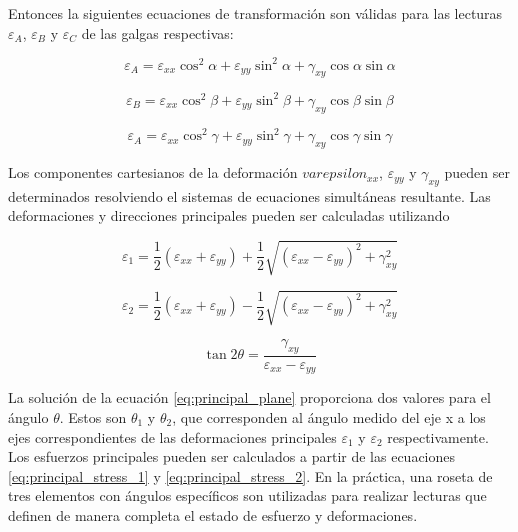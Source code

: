 Entonces la siguientes ecuaciones de transformación son válidas para las lecturas $\varepsilon_{A}$, 
$\varepsilon_{B}$ y $\varepsilon_{C}$ de las galgas respectivas:

\begin{equation}
\varepsilon_A = \varepsilon_{xx} \cos^2\alpha + \varepsilon_{yy} \sin^2\alpha + \gamma_{xy} \cos\alpha \sin\alpha
\end{equation}

\begin{equation}
\varepsilon_B = \varepsilon_{xx} \cos^2\beta + \varepsilon_{yy} \sin^2\beta + \gamma_{xy} \cos\beta \sin\beta
\end{equation}

\begin{equation}
\varepsilon_A = \varepsilon_{xx} \cos^2\gamma + \varepsilon_{yy} \sin^2\gamma + \gamma_{xy} \cos\gamma \sin\gamma
\end{equation}

Los componentes cartesianos de la deformación $varepsilon_{xx}$, $\varepsilon_{yy}$ y $\gamma_{xy}$ pueden 
ser determinados resolviendo el sistemas de ecuaciones simultáneas resultante. Las deformaciones 
y direcciones principales pueden ser calculadas utilizando 

\begin{equation}\label{eq:principal_strain_1}
\varepsilon_1 = \frac{1}{2} \left( \varepsilon_{xx} + \varepsilon_{yy} \right) + 
\frac{1}{2} \sqrt{\left( \varepsilon_{xx} - \varepsilon_{yy} \right)^2 + \gamma_{xy}^2 }
\end{equation}

\begin{equation}\label{eq:principal_strain_2}
\varepsilon_2 = \frac{1}{2} \left( \varepsilon_{xx} + \varepsilon_{yy} \right) - 
\frac{1}{2} \sqrt{\left( \varepsilon_{xx} - \varepsilon_{yy} \right)^2 + \gamma_{xy}^2 }
\end{equation}

\begin{equation}\label{eq:principal_plane}
\tan 2\theta = \frac{\gamma_{xy}}{\varepsilon_{xx} - \varepsilon_{yy}}
\end{equation}

La solución de la ecuación \ref{eq:principal_plane} proporciona dos valores para el ángulo $\theta$. Estos son 
$\theta_1$ y $\theta_2$, que corresponden al ángulo medido del eje x a los ejes correspondientes de las 
deformaciones principales $\varepsilon_1$ y $\varepsilon_2$ respectivamente.\\

Los esfuerzos principales pueden ser calculados a partir de las ecuaciones \ref{eq:principal_stress_1} y 
\ref{eq:principal_stress_2}. En la práctica, una roseta de tres elementos con ángulos específicos son 
utilizadas para realizar lecturas que definen de manera completa el estado de esfuerzo y deformaciones.
